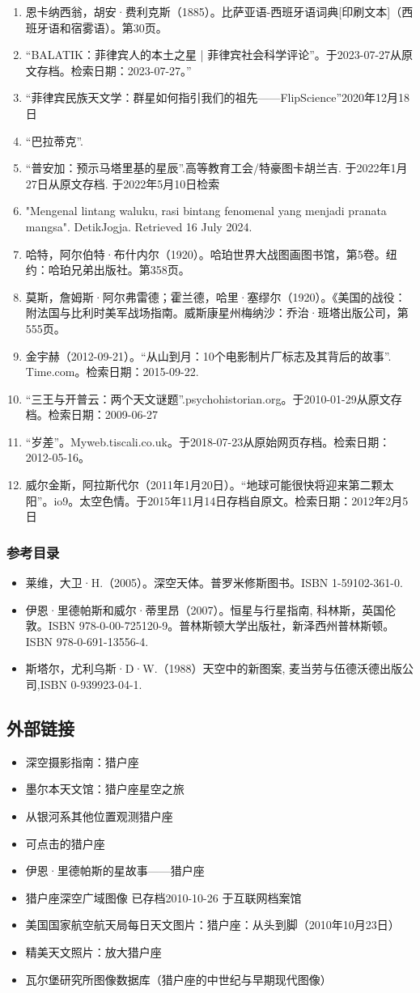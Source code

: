 \begin{enumerate}
\item 恩卡纳西翁，胡安·费利克斯（1885）。比萨亚语-西班牙语词典[印刷文本]（西班牙语和宿雾语）。第30页。
\item “BALATIK：菲律宾人的本土之星 | 菲律宾社会科学评论”。于2023-07-27从原文存档。检索日期：2023-07-27。”
\item “菲律宾民族天文学：群星如何指引我们的祖先——FlipScience”2020年12月18日
\item “巴拉蒂克”.
\item “普安加：预示马塔里基的星辰”.高等教育工会/特豪图卡胡兰吉. 于2022年1月27日从原文存档. 于2022年5月10日检索
\item "Mengenal lintang waluku, rasi bintang fenomenal yang menjadi pranata mangsa". DetikJogja. Retrieved 16 July 2024.
\item 哈特，阿尔伯特·布什内尔（1920）。哈珀世界大战图画图书馆，第5卷。纽约：哈珀兄弟出版社。第358页。
\item 莫斯，詹姆斯·阿尔弗雷德；霍兰德，哈里·塞缪尔（1920）。《美国的战役：附法国与比利时美军战场指南。威斯康星州梅纳沙：乔治·班塔出版公司，第555页。
\item 金宇赫（2012-09-21）。“从山到月：10个电影制片厂标志及其背后的故事”. Time.com。检索日期：2015-09-22.
\item “三王与开普云：两个天文谜题”.psychohistorian.org。于2010-01-29从原文存档。检索日期：2009-06-27
\item “岁差”。Myweb.tiscali.co.uk。于2018-07-23从原始网页存档。检索日期：2012-05-16。
\item 威尔金斯，阿拉斯代尔（2011年1月20日）。“地球可能很快将迎来第二颗太阳”。io9。太空色情。于2015年11月14日存档自原文。检索日期：2012年2月5日
\end{enumerate}
\subsubsection{参考目录}
\begin{itemize}
\item 莱维，大卫·H.（2005）。深空天体。普罗米修斯图书。ISBN 1-59102-361-0.
\item 伊恩·里德帕斯和威尔·蒂里昂（2007）。恒星与行星指南, 科林斯，英国伦敦。ISBN 978-0-00-725120-9。普林斯顿大学出版社，新泽西州普林斯顿。ISBN 978-0-691-13556-4.
\item 斯塔尔，尤利乌斯·D·W.（1988）天空中的新图案, 麦当劳与伍德沃德出版公司,ISBN 0-939923-04-1.
\end{itemize}
\subsection{外部链接}
\begin{itemize}
\item 深空摄影指南：猎户座
\item 墨尔本天文馆：猎户座星空之旅
\item 从银河系其他位置观测猎户座
\item 可点击的猎户座
\item 伊恩·里德帕斯的星故事——猎户座
\item 猎户座深空广域图像 已存档2010-10-26 于互联网档案馆
\item 美国国家航空航天局每日天文图片：猎户座：从头到脚（2010年10月23日）
\item 精美天文照片：放大猎户座
\item 瓦尔堡研究所图像数据库（猎户座的中世纪与早期现代图像）
\end{itemize}